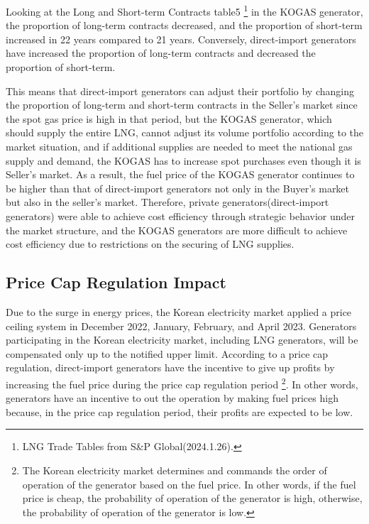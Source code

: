\documentclass[12pt]{article}
\begin{document}
Looking at the Long and Short-term Contracts table5 \footnote{LNG Trade Tables from S\&P Global(2024.1.26).} in the KOGAS generator, the proportion of long-term contracts decreased, and the proportion of short-term increased in 22 years compared to 21 years. Conversely, direct-import generators have increased the proportion of long-term contracts and decreased the proportion of short-term.

This means that direct-import generators can adjust their portfolio by changing the proportion of long-term and short-term contracts in the Seller's market since the spot gas price is high in that period, but the KOGAS generator, which should supply the entire LNG, cannot adjust its volume portfolio according to the market situation, and if additional supplies are needed to meet the national gas supply and demand, the KOGAS has to increase spot purchases even though it is Seller's market. As a result, the fuel price of the KOGAS generator continues to be higher than that of direct-import generators not only in the Buyer's market but also in the seller's market.
Therefore, private generators(direct-import generators) were able to achieve cost efficiency through strategic behavior under the market structure, and the KOGAS generators are more difficult to achieve cost efficiency due to restrictions on the securing of LNG supplies.





\subsection{Price Cap Regulation Impact}

Due to the surge in energy prices, the Korean electricity market applied a price ceiling system in December 2022, January, February, and April 2023. Generators participating in the Korean electricity market, including LNG generators, will be compensated only up to the notified upper limit. According to a price cap regulation, direct-import generators have the incentive to give up profits by increasing the fuel price during the price cap regulation period \footnote{The Korean electricity market determines and commands the order of operation of the generator based on the fuel price. In other words, if the fuel price is cheap, the probability of operation of the generator is high, otherwise, the probability of operation of the generator is low.}. In other words, generators have an incentive to out the operation by making fuel prices high because, in the price cap regulation period, their profits are expected to be low.
\end{document}
